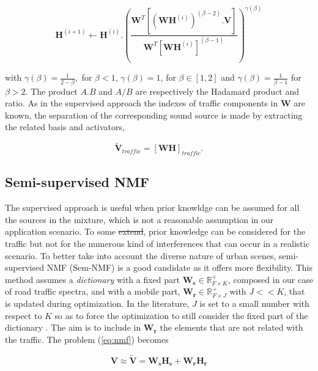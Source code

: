 \documentclass[twocolumn]{svjour3}          %
\providecommand{\DIFaddtex}[1]{{\protect\color{blue}\uwave{#1}}} %
\providecommand{\DIFdeltex}[1]{{\protect\color{red}\sout{#1}}}                      %
\providecommand{\DIFaddbegin}{} %
\providecommand{\DIFaddend}{} %
\providecommand{\DIFdelbegin}{} %
\providecommand{\DIFdelend}{} %
\providecommand{\DIFadd}[1]{\texorpdfstring{\DIFaddtex{#1}}{#1}} %
\providecommand{\DIFdel}[1]{\texorpdfstring{\DIFdeltex{#1}}{}} %
\begin{document}
\begin{equation}\label{eq:updateH_Sup}
\textbf{H}^{(i+1)} \leftarrow \textbf{H}^{(i)}.\left(\frac{\textbf{W}^T \left[\left(\textbf{WH}^{(i)} \right)^{(\beta-2)}.\textbf{V} \right]}{\textbf{W}^T \left[\textbf{WH}^{(i)} \right]^{(\beta-1)}}\right)^{\gamma(\beta)}
\end{equation}

with $\gamma(\beta) = \frac{1}{2-\beta},$ for $\beta < 1$, $ \gamma(\beta) = 1$, for $\beta \in \left[1,2\right]$ and $\gamma(\beta) = \frac{1}{\beta-1}$ for $\beta > 2$. The product $A.B$ and $A/B$ are respectively the Hadamard product and ratio. As in the supervised approach the indexes of traffic components in $\mathbf{W}$  are known, the separation of the corresponding sound source is made by extracting the related basis and activators,

\begin{equation}\label{eq:separationExtraction}
\mathbf{\tilde{V}}_{traffic} = \left[ \mathbf{WH} \right]_{traffic}.
\end{equation}

\subsection{Semi-supervised NMF}

The supervised approach is useful when prior knowldge can be assumed for all the sources in the mixture, which is not a reasonable assumption in our application scenario. To some \DIFdelbegin \DIFdel{extend}\DIFdelend \DIFaddbegin \DIFadd{extent}\DIFaddend , prior knowledge can be considered for the traffic but not for the numerous kind of interferences that can occur in a realistic scenario. To better take into account the diverse nature of urban scenes, semi-supervised NMF (Sem-NMF)\cite{lee_semi-supervised_2010} is a good candidate as it offers more flexibility. This method assumes a \textit{dictionary} with a fixed part $\mathbf{W_s} \in \mathbb{R}^+_{F\times K}$, composed in our case of road traffic spectra, and with a mobile part, $\mathbf{W_r} \in \mathbb{R}^+_{F\times J}$ with $J <<K$, that is updated during optimization. In the literature, $J$ is set to a small number with respect to $K$ so as to force the optimization to still consider the fixed part of the dictionary \cite{lefevre2012semi}. The aim is to include in $\mathbf{W_r}$ the elements that are not related with the traffic. The problem (\ref{eq:nmf}) becomes

\begin{equation}
\mathbf{V} \approx \mathbf{\tilde{V}} = \mathbf{W_s H_s}+ \mathbf{W_r H_r}
\end{equation}
\end{document}
